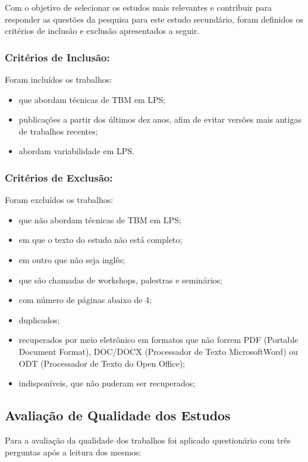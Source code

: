 Com o objetivo de selecionar os estudos mais relevantes e contribuir para responder as questões da pesquisa para este estudo secundário, foram definidos os critérios de inclusão e exclusão apresentados a seguir.

\subsubsection{Critérios de Inclusão:} Foram incluídos os trabalhos:

\begin{itemize}
	\item que abordam técnicas de TBM em LPS;
	\item publicações a partir dos últimos dez anos, afim de evitar versões mais antigas de trabalhos recentes;
	\item abordam variabilidade em LPS.
\end{itemize}


\subsubsection{Critérios de Exclusão:} Foram excluídos os trabalhos:

\begin{itemize}
	\item que não abordam técnicas de TBM em LPS;
	\item em que o texto do estudo não está completo;
	\item em outro que não seja inglês;
	\item que são chamadas de workshops, palestras e seminários;
	\item com número de páginas abaixo de 4;
	\item duplicados;
	\item recuperados por meio eletrônico em formatos que não forrem PDF (Portable Document Format), DOC/DOCX (Processador de Texto MicrosoftWord) ou ODT (Processador de Texto do Open Office);
	\item indisponíveis, que não puderam ser recuperados;
\end{itemize}

\subsection{Avaliação de Qualidade dos Estudos}

Para a avaliação da qualidade dos trabalhos foi aplicado questionário com três perguntas após a leitura dos mesmos:

